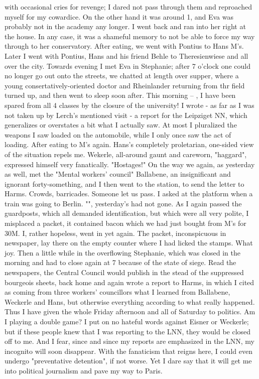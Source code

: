  with occasional cries for revenge; I dared not pass through them and reproached myself for my cowardice. On the other hand it was around 1, and Eva was probably not in the academy any longer. I went back and ran into her right at the house. In any case, it was a shameful memory to not be able to force my way through to her conservatory. After eating, we went with Pontius to Hans M's. Later I went with Pontius, Hans and his friend Behle to Theresienwiese and all over the city. Towards evening I met Eva in Stephanie; after 7 o'clock one could no longer go out onto the streets, we chatted at length over supper, where a young consertatively-oriented doctor and Rheinlander returning from thr field turned up, and then went to sleep soon after. This morning -- , I have been spared from all 4 classes by the closure of the university! I wrote - as far as I was not taken up by Lerch's mentioned visit - a report for the Leipziget NN, which generalizes or overstates a bit what I actually saw. At most I pluralized the weapons I saw loaded on the automobile, while I only once saw the act of loading. After eating to M's again. Hans's completely proletarian, one-sided view of the situation repels me. Wekerle, all-around gaunt and careworn, "haggard", expressed himself very fanatically. "Hostages!" On the way we again, as yesterday as well, met the "Mental workers' council" Ballabene, an insignificant and ignorant forty-something,  and I then went to the station, to send the letter to Harms. Crowds, barricades. Someone let us pass. I asked at the platform when a train was going to Berlin. "", yesterday's had not gone. As I again passed the guardposts, which all demanded identification, but which were all very polite, I misplaced a packet, it contained bacon which we had just bought from M's for 30M. I, rather hopeless, went in yet again. The packet, inconspicuous in newspaper, lay there on the empty counter where I had licked the stamps. What joy. Then a little while in the overflowing Stephanie, which was closed in the morning and had to close again at 7 because of the state of siege. Read the newspapers, the Central Council would publish in the stead of the suppressed bourgeois sheets, back home and again wrote a report to Harms, in which I cited as coming from three workers' councillors what I learned from Ballabene, Weckerle and Hans, but otherwise everything according to what really happened. Thus I have given the whole Friday afternoon and all of Saturday to politics. Am I playing a double game? I put on no hateful words against Eisner or Weckerle; but if these people knew that I was reporting to the LNN, they would be closed off to me. And I fear, since  and since my reports are emphasized in the LNN, my incognito will soon disappear. With the fanaticism that reigns here, I could even undergo "preventative detention", if not worse. Yet I dare say that it will get me into political journalism and pave my way to Paris.
 

